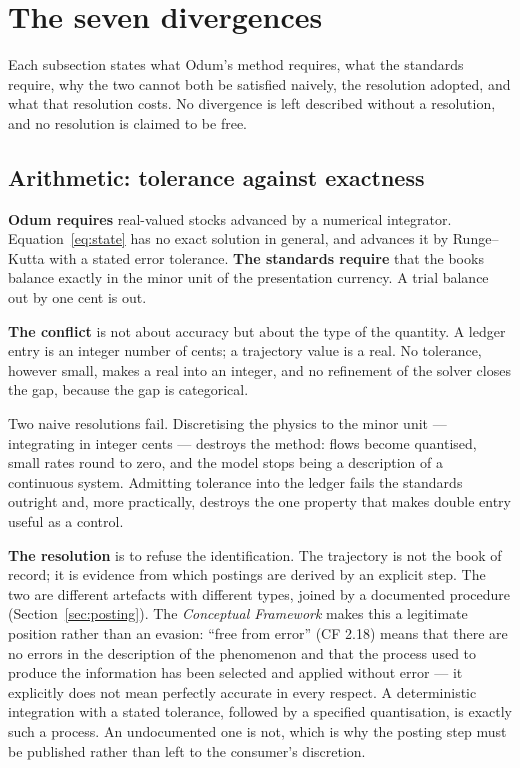 \documentclass[11pt,a4paper]{article}
\begin{document}
\section{The seven divergences}
\label{sec:divergences}

Each subsection states what Odum's method requires, what the standards require, why the two cannot both be satisfied naively, the resolution adopted, and what that resolution costs. No divergence is left described without a resolution, and no resolution is claimed to be free.

\subsection{Arithmetic: tolerance against exactness}
\label{sec:arith}

\textbf{Odum requires} real-valued stocks advanced by a numerical integrator. Equation~\eqref{eq:state} has no exact solution in general, and \gssk{} advances it by Runge--Kutta with a stated error tolerance. \textbf{The standards require} that the books balance exactly in the minor unit of the presentation currency. A trial balance out by one cent is out.

\textbf{The conflict} is not about accuracy but about the type of the quantity. A ledger entry is an integer number of cents; a trajectory value is a real. No tolerance, however small, makes a real into an integer, and no refinement of the solver closes the gap, because the gap is categorical.

Two naive resolutions fail. Discretising the physics to the minor unit --- integrating in integer cents --- destroys the method: flows become quantised, small rates round to zero, and the model stops being a description of a continuous system. Admitting tolerance into the ledger fails the standards outright and, more practically, destroys the one property that makes double entry useful as a control.

\textbf{The resolution} is to refuse the identification. The trajectory is not the book of record; it is evidence from which postings are derived by an explicit step. The two are different artefacts with different types, joined by a documented procedure (Section~\ref{sec:posting}). The \emph{Conceptual Framework} makes this a legitimate position rather than an evasion: ``free from error'' (CF 2.18) means that there are no errors in the description of the phenomenon and that the process used to produce the information has been selected and applied without error --- it explicitly does not mean perfectly accurate in every respect. A deterministic integration with a stated tolerance, followed by a specified quantisation, is exactly such a process. An undocumented one is not, which is why the posting step must be published rather than left to the consumer's discretion.
\end{document}
